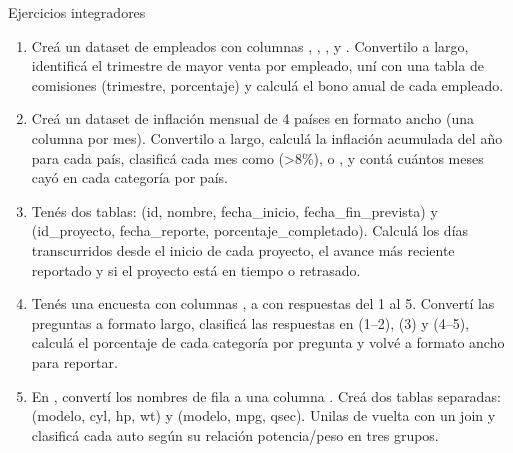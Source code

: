 \documentclass[8pt]{beamer}
\begin{document}
	\begin{frame}[fragile]{Ejercicios integradores}
		\begin{enumerate}[start=27]
			\item Creá un dataset de empleados con columnas , , ,  y . Convertilo a largo, identificá el trimestre de mayor venta por empleado, uní con una tabla de comisiones (trimestre, porcentaje) y calculá el bono anual de cada empleado.

			\item Creá un dataset de inflación mensual de 4 países en formato ancho (una columna por mes). Convertilo a largo, calculá la inflación acumulada del año para cada país, clasificá cada mes como  (>8\%),  o , y contá cuántos meses cayó en cada categoría por país.

			\item Tenés dos tablas:  (id, nombre, fecha\_inicio, fecha\_fin\_prevista) y  (id\_proyecto, fecha\_reporte, porcentaje\_completado). Calculá los días transcurridos desde el inicio de cada proyecto, el avance más reciente reportado y si el proyecto está en tiempo o retrasado.

			\item Tenés una encuesta con columnas ,  a  con respuestas del 1 al 5. Convertí las preguntas a formato largo, clasificá las respuestas en  (1--2),  (3) y  (4--5), calculá el porcentaje de cada categoría por pregunta y volvé a formato ancho para reportar.

			\item En , convertí los nombres de fila a una columna . Creá dos tablas separadas:  (modelo, cyl, hp, wt) y  (modelo, mpg, qsec). Unilas de vuelta con un join y clasificá cada auto según su relación potencia/peso en tres grupos.
		\end{enumerate}
	\end{frame}
\end{document}
